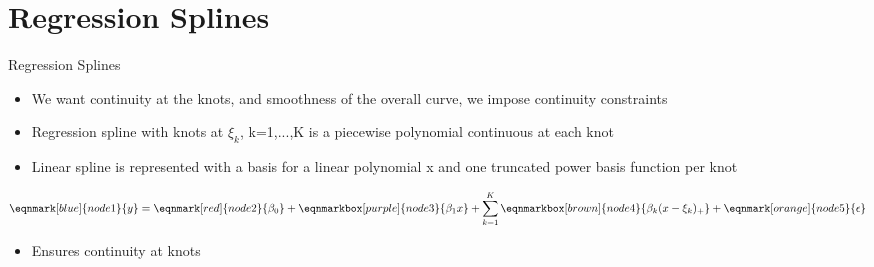\documentclass[english]{beamer}
\newcommand{\alertblue}[1]{{\color{blue}#1}}
\begin{document}
\section{Regression Splines}
\begin{frame}{Regression Splines}
    \begin{itemize}
        \item We want \alertblue{continuity} at the knots, and \alertblue{smoothness} of the overall curve, we \alertblue{impose continuity constraints} 
        \item \alertblue{Regression spline} with knots at \alertblue{$\xi_k$, k=1,...,K} is a piecewise polynomial \alertblue{continuous at each knot}
        \item  \alertblue{Linear spline} is represented with a basis for a linear polynomial x and one \alertblue{truncated power basis function} per knot
        \vspace{0.5cm}
    \end{itemize}    
    \begin{equation*}
        \eqnmark[blue]{node1}{y} =
        \eqnmark[red]{node2}{\beta_0} +
        \eqnmarkbox[purple]{node3}{\beta_1 x} +
        \sum_{k=1}^{K} \eqnmarkbox[brown]{node4}{\beta_k (x - \xi_k)_+} +
        \eqnmark[orange]{node5}{\epsilon}
    \end{equation*}
    \begin{itemize}
        \item Ensures \alertblue{continuity} at knots
    \end{itemize}
\end{frame}
\end{document}

